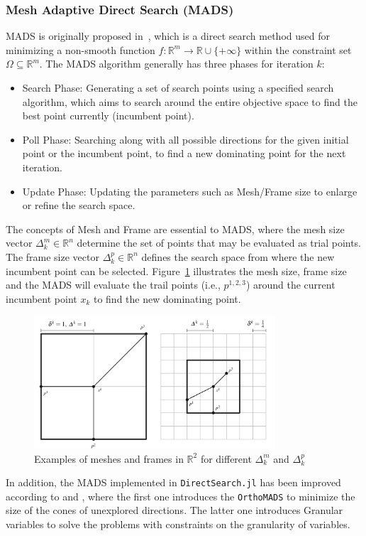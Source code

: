 \documentclass[11pt,oneside,onecolumn,openright]{article}
\begin{document}
    \subsubsection*{Mesh Adaptive Direct Search (MADS)}\label{sec:MADS}
    MADS is originally proposed in~\cite{audet2006mesh}, which is a direct search method used for minimizing a non-smooth function $f: \mathbb{R}^{m} \rightarrow \mathbb{R} \cup\{+\infty\}$ within the constraint set $\Omega \subseteq \mathbb{R}^{m}$. The MADS algorithm generally has three phases for iteration $k$:
    \begin{itemize}
    \item Search Phase: Generating a set of search points using a specified search algorithm, which aims to search around the entire objective space to find the best point currently (incumbent point). 
    \item Poll Phase: Searching along with all possible directions for the given initial point or the incumbent point, to find a new dominating point for the next iteration.
    \item Update Phase: Updating the parameters such as Mesh/Frame size to enlarge or refine the search space.
    \end{itemize}

    The concepts of Mesh and Frame are essential to MADS, where the mesh size vector $\Delta^{m}_{k} \in \mathbb{R}^n$ determine the set of points that may be evaluated as trial points. The frame size vector $\Delta^{p}_{k} \in \mathbb{R}^n$ defines the search space from where the new incumbent point can be selected. Figure~\ref{fig:mesh} illustrates the mesh size, frame size and the MADS will evaluate the trail points (i.e., $p^{1,2,3}$) around the current incumbent point $x_k$ to find the new dominating point.

    \begin{figure}[H]
    \centering
    \includegraphics[width=9cm]{fig/mesh-frame.jpg}
    \caption{Examples of meshes and frames in $\mathbb{R}^{2}$ for different $\Delta^{m}_{k}$ and $\Delta^{p}_{k}$~\cite{audet2006mesh}}
    \label{fig:mesh}
    \end{figure}
     In addition, the MADS implemented in \verb|DirectSearch.jl| has been improved according to \cite{abramson2009orthomads} and \cite{audet2019mesh}, where the first one introduces the \verb|OrthoMADS| to minimize the size of the cones of unexplored directions. The latter one introduces Granular variables to solve the problems with constraints on the granularity of variables.
\end{document}
